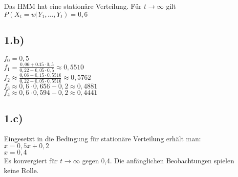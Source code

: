 \documentclass[a4paper]{article}
\begin{document}
Das HMM hat eine stationäre Verteilung. Für $t\rightarrow \infty$ gilt\\
$ P(X_t=w|Y_1,...,Y_t)=0,6$
\subsection*{1.b)}
$f_0 = 0,5$\\
$f_1=\frac{0,06+0.15\cdot 0,5}{0,22+0,05\cdot 0,5} \approx 0,5510$\\
$f_2\approx \frac{0,06+0,15\cdot 0,5510}{0,22+0,05\cdot 0,5510}\approx 0,5762$\\
$f_3\approx 0,6\cdot 0,656 + 0,2 \approx 0,4881$\\
$f_4\approx 0,6\cdot 0,594 + 0,2 \approx 0,4441$\\

\subsection*{1.c)}
Eingesetzt in die Bedingung für stationäre Verteilung erhält man:\\
$x=0,5x+0,2$\\
$x=0,4$\\
Es konvergiert für $t\rightarrow \infty$ gegen 0,4. Die anfänglichen Beobachtungen spielen keine Rolle.
\end{document}
